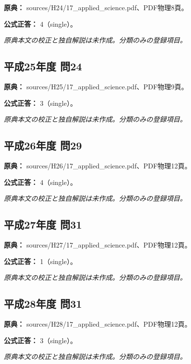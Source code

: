\noindent\textbf{原典：} sources/H24/17\_applied\_science.pdf、PDF物理8頁。

\textbf{公式正答：} 4（single）。

\par\textit{原典本文の校正と独自解説は未作成。分類のみの登録項目。}

\subsection{平成25年度 問24}
\label{q:h25-reg-applied-24}

\noindent\textbf{原典：} sources/H25/17\_applied\_science.pdf、PDF物理9頁。

\textbf{公式正答：} 3（single）。

\par\textit{原典本文の校正と独自解説は未作成。分類のみの登録項目。}

\subsection{平成26年度 問29}
\label{q:h26-reg-applied-29}

\noindent\textbf{原典：} sources/H26/17\_applied\_science.pdf、PDF物理12頁。

\textbf{公式正答：} 4（single）。

\par\textit{原典本文の校正と独自解説は未作成。分類のみの登録項目。}

\subsection{平成27年度 問31}
\label{q:h27-reg-applied-31}

\noindent\textbf{原典：} sources/H27/17\_applied\_science.pdf、PDF物理12頁。

\textbf{公式正答：} 1（single）。

\par\textit{原典本文の校正と独自解説は未作成。分類のみの登録項目。}

\subsection{平成28年度 問31}
\label{q:h28-reg-applied-31}

\noindent\textbf{原典：} sources/H28/17\_applied\_science.pdf、PDF物理12頁。

\textbf{公式正答：} 3（single）。

\par\textit{原典本文の校正と独自解説は未作成。分類のみの登録項目。}

